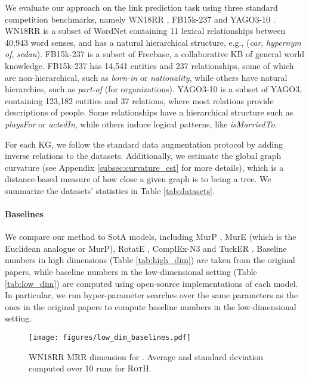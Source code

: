 \documentclass[11pt,a4paper]{article}
\begin{document}
We evaluate our approach on the link prediction task using three standard competition benchmarks, namely WN18RR \cite{bordes2013translating,dettmers2018convolutional}, FB15k-237 \cite{bordes2013translating,toutanova2015observed} and YAGO3-10 \cite{mahdisoltani2013yago3}. 
WN18RR is a subset of WordNet containing 11 lexical relationships between 40,943 word senses, and has a natural hierarchical structure, e.g., (\textit{car}, \textit{hypernym of}, \textit{sedan}).  
FB15k-237 is a subset of Freebase, a collaborative KB of general world knowledge. 
FB15k-237 has 14,541 entities and 237 relationships, some of which are non-hierarchical, such as \textit{born-in} or \textit{nationality}, while others have natural hierarchies, such as \textit{part-of} (for organizations). 
YAGO3-10 is a subset of YAGO3, containing 123,182 entities and 37
relations, where most relations provide descriptions of people. 
Some relationships have a hierarchical structure such as \textit{playsFor} or \textit{actedIn}, while others induce logical patterns, like \textit{isMarriedTo}. 

For each KG, we follow the standard data augmentation protocol by adding inverse relations \cite{lacroix2018canonical} to the datasets.
Additionally, we estimate the global graph curvature  \cite{gu2019mixed} (see Appendix \ref{subsec:curvature_est} for more details), which is a distance-based measure of how close a given graph is to being a tree. 
We summarize the datasets' statistics in Table \ref{tab:datasets}.

\paragraph{Baselines} 
We compare our method to SotA models, including MurP \cite{balazevic2019tucker}, MurE (which is the Euclidean analogue or MurP), RotatE \cite{sun2019rotate}, ComplEx-N3 \cite{lacroix2018canonical} and TuckER \cite{balazevic2019tucker}. 
Baseline numbers in high dimensions (Table \ref{tab:high_dim}) are taken from the original papers, while baseline numbers in the low-dimensional setting (Table \ref{tab:low_dim}) are computed using open-source implementations of each model. 
In particular, we run hyper-parameter searches over the same parameters as the ones in the original papers to compute baseline numbers in the low-dimensional setting.

\begin{figure}[t]
    \centering
    \texttt{[image: figures/low\_dim\_baselines.pdf]}
    \caption{WN18RR MRR dimension for . Average and standard deviation computed over 10 runs for \textsc{RotH}.}
    \label{fig:low_dim_plot}
\end{figure}
\end{document}
